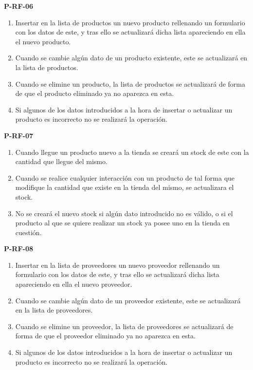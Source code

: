 \textbf{P-RF-06}
\begin{enumerate}
	\item Insertar en la lista de productos un nuevo producto rellenando un formulario con los datos de este, y tras ello se actualizará dicha lista apareciendo en ella el nuevo producto.
	\item Cuando se cambie algún dato de un producto existente, este se actualizará en la lista de productos.
	\item Cuando se elimine un producto, la lista de productos se actualizará de forma de que el producto eliminado ya no aparezca en esta.
	\item Si algunos de los datos introducidos a la hora de insertar o actualizar un producto es incorrecto no se realizará la operación.
\end{enumerate}

\textbf{P-RF-07}
\begin{enumerate}
	\item Cuando llegue un producto nuevo a la tienda se creará un stock de este con la cantidad que llegue del mismo.
	\item Cuando se realice cualquier interacción con un producto de tal forma que modifique la cantidad que existe en la tienda del mismo, se actualizara el stock.
	\item No se creará el nuevo stock si algún dato introducido no es válido, o si el producto al que se quiere realizar un stock ya posee uno en la tienda en cuestión.
\end{enumerate}

\textbf{P-RF-08}
\begin{enumerate}
	\item Insertar en la lista de proveedores un nuevo proveedor rellenando un formulario con los datos de este, y tras ello se actualizará dicha lista apareciendo en ella el nuevo proveedor.
	\item Cuando se cambie algún dato de un proveedor existente, este se actualizará en la lista de proveedores.
	\item Cuando se elimine un proveedor, la lista de proveedores se actualizará de forma de que el proveedor eliminado ya no aparezca en esta.
	\item Si algunos de los datos introducidos a la hora de insertar o actualizar un producto es incorrecto no se realizará la operación.
\end{enumerate}

